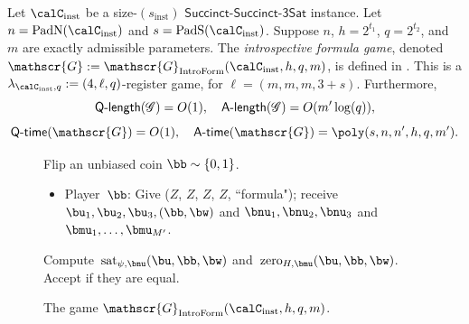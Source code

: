 \documentclass[11pt]{article}
\newcommand{\succinctsquared}{\mathsf{Succinct}\text{-}\mathsf{Succinct}\text{-}\mathsf{3Sat}}
\newcommand{\game}{\mathscr{G}}
\newcommand{\qtime}[1]{\mathsf{Q}\textnormal{-}\mathsf{time}(#1)}
\newcommand{\atime}[1]{\mathsf{A}\textnormal{-}\mathsf{time}(#1)}
\newcommand{\qlength}[1]{\mathsf{Q}\textnormal{-}\mathsf{length}(#1)}
\newcommand{\alength}[1]{\mathsf{A}\textnormal{-}\mathsf{length}(#1)}
\begin{document}
\begin{definition}\label{def:formula-game}
Let $\calC_{\mathrm{inst}}$ be a size-$(s_{\mathrm{inst}})$ $\succinctsquared$ instance.
Let $n = \mathrm{PadN}(\calC_{\mathrm{inst}})$ and $s = \mathrm{PadS}(\calC_{\mathrm{inst}})$.
Suppose $n$, $h = 2^{t_1}$, $q = 2^{t_2}$, and $m$ are exactly admissible parameters.
The \emph{introspective formula game},
denoted $\game := \game_{\mathrm{IntroForm}}(\calC_{\mathrm{inst}}, h, q, m)$, is defined in .
This is a $\lambda_{\calC_{\mathrm{inst}}, q} := (4, \ell, q)$-register game, for $\ell = (m, m, m, 3 + s)$.
Furthermore,
\begin{equation*}
\qlength{\game} = O(1), \quad
\alength{\game} = O(m' \log(q)),
\end{equation*}
\begin{equation*}
\qtime{\game} = O(1), \quad
\atime{\game} = \poly(s, n, n', h, q, m').
\end{equation*}
\end{definition}
{
\begin{figure}
Flip an unbiased coin $\bb \sim \{0, 1\}$.
	\begin{itemize}
	\item[$\circ$] Player~$\bb$: Give ($Z$, $Z$, $Z$, $Z$, ``formula"); 
				receive $\bu_1, \bu_2, \bu_3, (\bb, \bw)$ and $\bnu_1, \bnu_2, \bnu_3$ and $\bmu_1, \ldots, \bmu_{M'}$.
	\end{itemize}
	Compute~$\mathrm{sat}_{\psi, \bnu}(\bu, \bb, \bw)$ and~$\mathrm{zero}_{H, \bmu}(\bu, \bb, \bw)$.
	Accept if they are equal.
	\caption{The game $\game_{\mathrm{IntroForm}}(\calC_{\mathrm{inst}}, h, q, m)$.\label{fig:formula-game}}
\end{figure}
}
\end{document}
